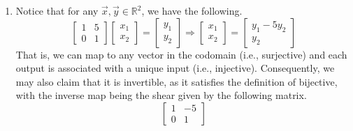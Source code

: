 \begin{SaveQuestion}
\begin{enumerate}
        \item Notice that for any $\vec x, \vec y \in \mathbb{R}^2$, we have the following.
        $$\begin{bmatrix} 1 & 5 \\ 0 & 1 \end{bmatrix}\begin{bmatrix} x_1 \\ x_2 \end{bmatrix} = \begin{bmatrix} y_1 \\ y_2 \end{bmatrix} \Longrightarrow \begin{bmatrix} x_1 \\ x_2 \end{bmatrix} = \begin{bmatrix} y_1 - 5y_2 \\ y_2 \end{bmatrix}$$
        That is, we can map to any vector in the codomain (i.e., surjective) and each output is associated with a unique input (i.e., injective). Consequently, we may also claim that it is invertible, as it satisfies the definition of bijective, with the inverse map being the shear given by the following matrix.
        $$\begin{bmatrix} 1 & -5 \\ 0 & 1 \end{bmatrix}$$
    \end{enumerate}
\end{SaveQuestion}


